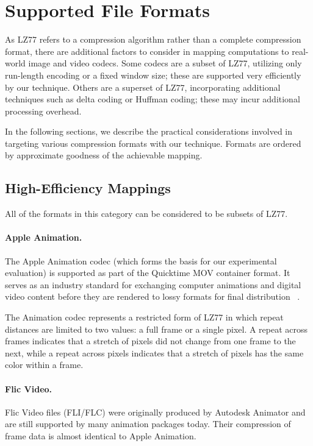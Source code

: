 \section{Supported File Formats}
\label{sec:formats}

As LZ77 refers to a compression algorithm rather than a complete
compression format, there are additional factors to consider in
mapping computations to real-world image and video codecs.  Some
codecs are a subset of LZ77, utilizing only run-length encoding or a
fixed window size; these are supported very efficiently by our
technique.  Others are a superset of LZ77, incorporating additional
techniques such as delta coding or Huffman coding; these may incur
additional processing overhead.

In the following sections, we describe the practical considerations
involved in targeting various compression formats with our technique.
Formats are ordered by approximate goodness of the achievable mapping.

\subsection{High-Efficiency Mappings}
\label{sec:formats-good}

All of the formats in this category can be considered to be subsets of
LZ77.

\paragraph{Apple Animation.}  
The Apple Animation codec (which forms the basis for our experimental
evaluation) is supported as part of the Quicktime MOV container
format.  It serves as an industry standard for exchanging computer
animations and digital video content before they are rendered to lossy
formats for final distribution~\cite[p.~106]{adobe-anim}\cite[p.~284]{harrington-anim} \cite[p.~367]{long-anim}\cite[p.~280]{pogue-anim}.

The Animation codec represents a restricted form of LZ77 in which
repeat distances are limited to two values: a full frame or a single
pixel.  A repeat across frames indicates that a stretch of pixels did
not change from one frame to the next, while a repeat across pixels
indicates that a stretch of pixels has the same color within a frame.

\paragraph{Flic Video.}
Flic Video files (FLI/FLC) were originally produced by Autodesk
Animator and are still supported by many animation packages today.
Their compression of frame data is almost identical to Apple
Animation.

